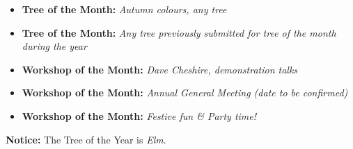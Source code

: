 \medskip
{}
\begin{itemize}
    \item \textbf{Tree of the Month:} \textit{Autumn colours, any tree}
\end{itemize}

\medskip
{}
\begin{itemize}
    \item \textbf{Tree of the Month:} \textit{Any tree previously submitted for tree of the month during the year}
    \item \textbf{Workshop of the Month:} \textit{\textit{Dave Cheshire,} demonstration talks}
\end{itemize}

\medskip
{}
\begin{itemize}
    \item \textbf{Workshop of the Month:} \textit{Annual General Meeting (date to be confirmed)}
\end{itemize}

\medskip
{}
\begin{itemize}
    \item \textbf{Workshop of the Month:} \textit{Festive fun \& Party time!}
\end{itemize}

\noindent
\textbf{Notice:} The Tree of the Year is \textit{Elm}.

\closearticle
\columnbreak
